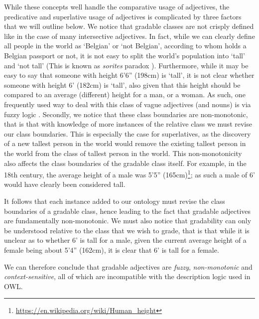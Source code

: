 \documentclass[11pt]{article}
\begin{document}
While these concepts well handle the comparative usage of adjectives, the 
predicative and superlative usage of adjectives is complicated by three factors
that we will outline below. We notice that gradable classes are not 
crisply defined like in the case of many intersective adjectives. In fact, while we can clearly define all people in the world as `Belgian' or 
`not Belgian', according to whom holds a Belgian passport or not, it is not easy to
split the world's population into `tall' and `not tall' (This is known as \emph{sorites} paradox \cite{Bennett06kr}).
Furthermore, while it may 
be easy to say that someone with height 6'6'' (198cm) is `tall', it is not clear 
whether someone with height 6' (182cm) is `tall', also given that this height should be compared to an average (different)
height for a man, or a woman. 
As such, one frequently used way to deal with this class of vague adjectives (and nouns) is via fuzzy logic \cite{Goguen1969fuzzy,Zadeh1975fuzzy,Zadeh1965fuzzy,DuboisPrade88en,Bennett06kr}.
Secondly, we notice that these class boundaries are 
non-monotonic, that is that with knowledge of more instances of the relative 
class we must revise our class boundaries. This is especially the case for superlatives, as the discovery of a new tallest person in the world would remove 
the existing tallest person in the world from the class of tallest person in the 
world. This non-monotonicity also affects the class boundaries of the gradable 
class itself. For example, in the 18th century, the average height of a male was 
5'5'' (165cm)\footnote{\url{https://en.wikipedia.org/wiki/Human_height}}; as such a male of 6' would have clearly been considered tall. 

It follows that each instance added to our ontology must 
revise the class boundaries of a gradable class, hence leading to the fact that 
gradable adjectives are fundamentally non-monotonic. We must also notice 
that gradability can only be understood relative to the class that we wish to 
grade, that is that while it is unclear as to whether 6' is tall for a male, 
given the current average height of a female being about 5'4'' (162cm), it is clear 
that 6' is tall for a female.

We can therefore conclude that gradable adjectives are \emph{fuzzy}, \emph{non-monotonic} 
and \emph{context-sensitive}, all of which are incompatible with the description 
logic used in OWL.
\end{document}
